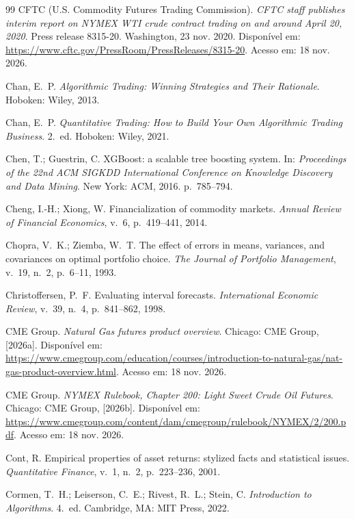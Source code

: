 \begin{thebibliography}{99}
CFTC (U.S. Commodity Futures Trading Commission). \emph{CFTC staff publishes interim report on NYMEX WTI crude contract trading on and around April 20, 2020}. Press release 8315-20. Washington, 23 nov. 2020. Disponível em: \url{https://www.cftc.gov/PressRoom/PressReleases/8315-20}. Acesso em: 18 nov. 2026.

Chan, E.~P. \emph{Algorithmic Trading: Winning Strategies and Their Rationale}. Hoboken: Wiley, 2013.

Chan, E.~P. \emph{Quantitative Trading: How to Build Your Own Algorithmic Trading Business}. 2.~ed. Hoboken: Wiley, 2021.

Chen, T.; Guestrin, C. XGBoost: a scalable tree boosting system. In: \emph{Proceedings of the 22nd ACM SIGKDD International Conference on Knowledge Discovery and Data Mining}. New York: ACM, 2016. p.~785--794.

Cheng, I.-H.; Xiong, W. Financialization of commodity markets. \emph{Annual Review of Financial Economics}, v.~6, p.~419--441, 2014.

Chopra, V.~K.; Ziemba, W.~T. The effect of errors in means, variances, and covariances on optimal portfolio choice. \emph{The Journal of Portfolio Management}, v.~19, n.~2, p.~6--11, 1993.

Christoffersen, P.~F. Evaluating interval forecasts. \emph{International Economic Review}, v.~39, n.~4, p.~841--862, 1998.

CME Group. \emph{Natural Gas futures product overview}. Chicago: CME Group, [2026a]. Disponível em: \url{https://www.cmegroup.com/education/courses/introduction-to-natural-gas/nat-gas-product-overview.html}. Acesso em: 18 nov. 2026.

CME Group. \emph{NYMEX Rulebook, Chapter 200: Light Sweet Crude Oil Futures}. Chicago: CME Group, [2026b]. Disponível em: \url{https://www.cmegroup.com/content/dam/cmegroup/rulebook/NYMEX/2/200.pdf}. Acesso em: 18 nov. 2026.

Cont, R. Empirical properties of asset returns: stylized facts and statistical issues. \emph{Quantitative Finance}, v.~1, n.~2, p.~223--236, 2001.

Cormen, T.~H.; Leiserson, C.~E.; Rivest, R.~L.; Stein, C. \emph{Introduction to Algorithms}. 4.~ed. Cambridge, MA: MIT Press, 2022.


\end{thebibliography}
